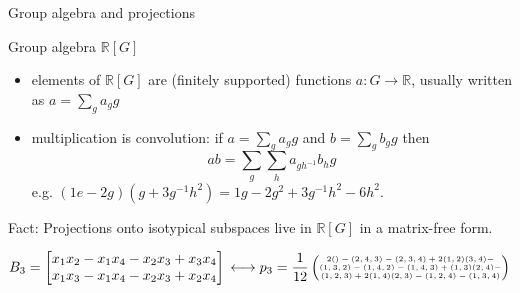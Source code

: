 \documentclass[9pt]{beamer}
\theoremstyle{definition}
\newcommand{\R}{\mathbb{R}}
\begin{document}
\begin{frame}{Group algebra and projections}
  \begin{definition}{Group algebra $\R[G]$}
    \begin{itemize}
      \item elements of $\R[G]$ are (finitely supported) functions $a\colon G \to \R$, usually written as $a = \sum_g a_g g$
      \pause
      \item multiplication is convolution: if $a = \sum_{g} a_g g$ and $b = \sum_{g} b_g g$ then \[ab = \sum_g \sum_h a_{gh^{-1}}b_h g\]
      \pause e.g. $(1e-2g)(g + 3g^{-1} h^2) = 1g - 2g^{2} + 3g^{-1}h^2 - 6h^{2}$.
    \end{itemize}
    \end{definition}

    \pause
    \begin{block}{Fact:}
    Projections onto isotypical subspaces live in $\mathbb{R}[G]$ in a matrix-free form.
    \end{block}
    \vspace*{-0.2in}
    \pause
    \[
    B_3 = \begin{bmatrix}
      x_{1}x_{2} - x_{1}x_{4} - x_{2}x_{3} + x_{3}x_{4}\\
      x_{1}x_{3} - x_{1}x_{4} - x_{2}x_{3} + x_{2}x_{4}
      \end{bmatrix}\\
    \longleftrightarrow
    \tiny
    p_3 = \frac{1}{12}\begin{pmatrix}
      2() - (2,4,3) -(2,3,4)  + 2(1,2)(3,4)  - \\
      (1,3,2)  - (1,4,2)  - (1,4,3)  + (1,3)(2,4)  - \\
      (1,2,3)  + 2(1,4)(2,3)  - (1,2,4)  - (1,3,4)
    \end{pmatrix}
    \]
\end{frame}
\end{document}
